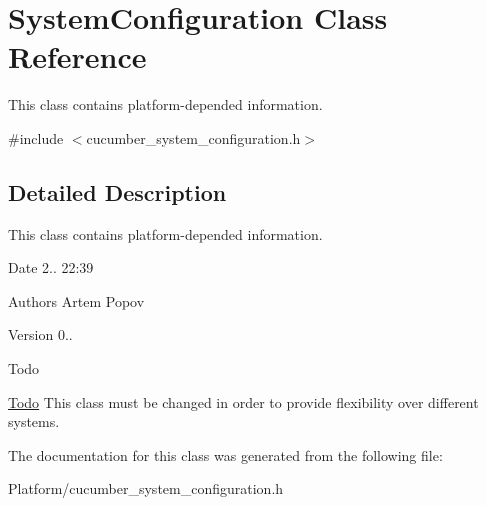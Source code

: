 \hypertarget{classSystemConfiguration}{}\section{System\+Configuration Class Reference}
\label{classSystemConfiguration}


This class contains platform-\/depended information.  




{\ttfamily \#include $<$cucumber\+\_\+system\+\_\+configuration.\+h$>$}



\subsection{Detailed Description}
This class contains platform-\/depended information. 

\begin{DoxyDate}{Date}
2.. 22\+:39 
\end{DoxyDate}
\begin{DoxyAuthor}{Authors}
Artem Popov 
\end{DoxyAuthor}
\begin{DoxyVersion}{Version}
0..
\end{DoxyVersion}
\begin{DoxyRefDesc}{Todo}
\item[\hyperlink{todo__todo000002}{Todo}]This class must be changed in order to provide flexibility over different systems. \end{DoxyRefDesc}


The documentation for this class was generated from the following file\+:\begin{DoxyCompactItemize}
\item 
Platform/cucumber\+\_\+system\+\_\+configuration.\+h\end{DoxyCompactItemize}
